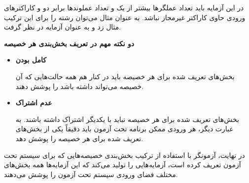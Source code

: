 در این آزمایه باید تعداد عملگرها بیشتر از یک و تعداد عملوند‌ها برابر دو و کاراکترهای ورودی حاوی کاراکتر غیرمجاز نباشد. به عنوان مثال می‌توان رشته  را برای این ترکیب مثال زد و به عنوان آزمایه در نظر گرفت.

\textbf{دو نکته مهم در تعریف بخش‌بندی هر خصیصه}

\begin{itemize}
	\item \textbf{کامل بودن}
	
	بخش‌های تعریف شده برای هر خصیصه باید در کنار هم همه حالت‌هایی که آن خصیصه می‌تواند داشته باشد را پوشش دهند.
	
	\item \textbf{عدم اشتراک}
	
	بخش‌های تعریف شده برای هر خصیصه نباید با یکدیگر اشتراک داشته باشند. به عبارت دیگر، هر ورودی ممکن برنامه تحت آزمون باید دقیقاً یکی از بخش‌های تعریف شده برای هر خصیصه را پوشش دهد.
\end{itemize}

در نهایت، آزمونگر با استفاده از ترکیب بخش‌بندی خصیصه‌هایی که برای سیستم تحت آزمون تعریف کرده است، آزمایه‌هایی را تولید می‌کند که این آزمایه‌ها همه بخش‌های مختلف فضای ورودی سیستم تحت آزمون را پوشش می‌دهند.

